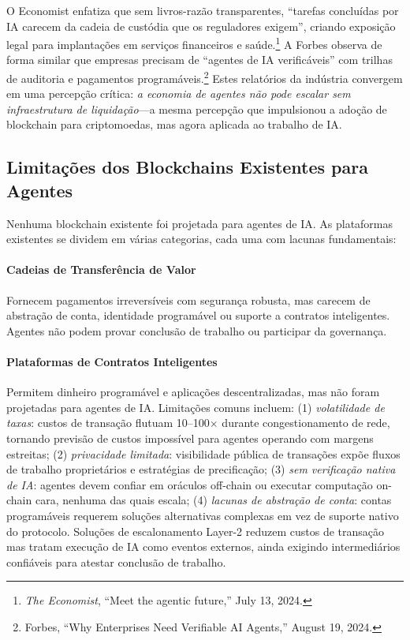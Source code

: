 \documentclass[11pt]{article}
\begin{document}
O Economist enfatiza que sem livros-razão transparentes, ``tarefas concluídas por IA carecem da cadeia de custódia que os reguladores exigem'', criando exposição legal para implantações em serviços financeiros e saúde.\footnote{\emph{The Economist}, ``Meet the agentic future,'' July 13, 2024.} A Forbes observa de forma similar que empresas precisam de ``agentes de IA verificáveis'' com trilhas de auditoria e pagamentos programáveis.\footnote{Forbes, ``Why Enterprises Need Verifiable AI Agents,'' August 19, 2024.} Estes relatórios da indústria convergem em uma percepção crítica: \emph{a economia de agentes não pode escalar sem infraestrutura de liquidação}---a mesma percepção que impulsionou a adoção de blockchain para criptomoedas, mas agora aplicada ao trabalho de IA.

\subsection{Limitações dos Blockchains Existentes para Agentes}
Nenhuma blockchain existente foi projetada para agentes de IA. As plataformas existentes se dividem em várias categorias, cada uma com lacunas fundamentais:

\paragraph{Cadeias de Transferência de Valor} Fornecem pagamentos irreversíveis com segurança robusta, mas carecem de abstração de conta, identidade programável ou suporte a contratos inteligentes. Agentes não podem provar conclusão de trabalho ou participar da governança.

\paragraph{Plataformas de Contratos Inteligentes} Permitem dinheiro programável e aplicações descentralizadas, mas não foram projetadas para agentes de IA. Limitações comuns incluem: (1) \emph{volatilidade de taxas}: custos de transação flutuam 10--100$\times$ durante congestionamento de rede, tornando previsão de custos impossível para agentes operando com margens estreitas; (2) \emph{privacidade limitada}: visibilidade pública de transações expõe fluxos de trabalho proprietários e estratégias de precificação; (3) \emph{sem verificação nativa de IA}: agentes devem confiar em oráculos off-chain ou executar computação on-chain cara, nenhuma das quais escala; (4) \emph{lacunas de abstração de conta}: contas programáveis requerem soluções alternativas complexas em vez de suporte nativo do protocolo. Soluções de escalonamento Layer-2 reduzem custos de transação mas tratam execução de IA como eventos externos, ainda exigindo intermediários confiáveis para atestar conclusão de trabalho.
\end{document}

